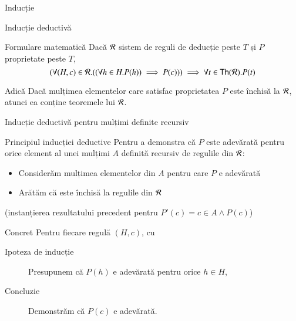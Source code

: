 \documentclass[xcolor=pdftex,romanian,colorlinks]{beamer}
\begin{document}
\begin{section}{Inducție}
\begin{frame}{Inducție deductivă}

\begin{block}{Formulare matematică}
Dacă $\cal R$ sistem de reguli de deducție peste $T$ și $P$ proprietate peste $T$,
\[(\forall (H,c)\in {\cal R}.((\forall h\in H.P(h))\implies P(c)))\implies \forall t\in{\sf Th}({\cal R}).P(t)\]
\end{block}


\begin{block}{Adică}
  Dacă mulțimea elementelor care satisfac proprietatea $P$ este închisă la ${\cal R}$, atunci ea conține teoremele lui ${\cal R}$. 
\end{block}
\end{frame}

\begin{frame}{Inducție deductivă pentru mulțimi definite recursiv}

\begin{block}{Principiul inducției deductive}
Pentru a demonstra că $P$ este adevărată pentru orice element al unei mulțimi $A$ definită recursiv de regulile din $\cal R$:
\begin{itemize}
  \item Considerăm mulțimea elementelor din $A$ pentru care $P$ e adevărată
  \item Arătăm că este închisă la regulile din $\cal R$
\end{itemize}
(instanțierea rezultatului precedent pentru $P'(c) = c \in A  \wedge P(c)$)
\end{block}

\begin{block}{Concret}
Pentru fiecare regulă $(H,c)$, cu 
\begin{description} 
\item[Ipoteza de inducție] Presupunem că $P(h)$ e adevărată pentru orice $h\in H$,
\item[Concluzie] Demonstrăm că $P(c)$ e adevărată.
\end{description}	
\end{block}
\end{frame}



\end{section}
\end{document}
